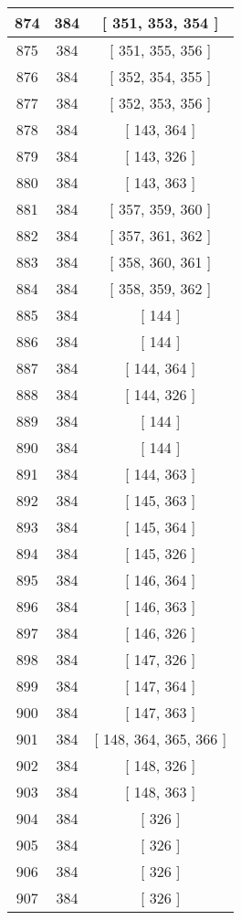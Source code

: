 \begin{center}
\begin{longtable}[H]{|| c c c ||}
\hline
874 & 384 & [ 351, 353, 354 ] \\ 
\hline
875 & 384 & [ 351, 355, 356 ] \\ 
\hline
876 & 384 & [ 352, 354, 355 ] \\ 
\hline
877 & 384 & [ 352, 353, 356 ] \\ 
\hline
878 & 384 & [ 143, 364 ] \\ 
\hline
879 & 384 & [ 143, 326 ] \\ 
\hline
880 & 384 & [ 143, 363 ] \\ 
\hline
881 & 384 & [ 357, 359, 360 ] \\ 
\hline
882 & 384 & [ 357, 361, 362 ] \\ 
\hline
883 & 384 & [ 358, 360, 361 ] \\ 
\hline
884 & 384 & [ 358, 359, 362 ] \\ 
\hline
885 & 384 & [ 144 ] \\ 
\hline
886 & 384 & [ 144 ] \\ 
\hline
887 & 384 & [ 144, 364 ] \\ 
\hline
888 & 384 & [ 144, 326 ] \\ 
\hline
889 & 384 & [ 144 ] \\ 
\hline
890 & 384 & [ 144 ] \\ 
\hline
891 & 384 & [ 144, 363 ] \\ 
\hline
892 & 384 & [ 145, 363 ] \\ 
\hline
893 & 384 & [ 145, 364 ] \\ 
\hline
894 & 384 & [ 145, 326 ] \\ 
\hline
895 & 384 & [ 146, 364 ] \\ 
\hline
896 & 384 & [ 146, 363 ] \\ 
\hline
897 & 384 & [ 146, 326 ] \\ 
\hline
898 & 384 & [ 147, 326 ] \\ 
\hline
899 & 384 & [ 147, 364 ] \\ 
\hline
900 & 384 & [ 147, 363 ] \\ 
\hline
901 & 384 & [ 148, 364, 365, 366 ] \\ 
\hline
902 & 384 & [ 148, 326 ] \\ 
\hline
903 & 384 & [ 148, 363 ] \\ 
\hline
904 & 384 & [ 326 ] \\ 
\hline
905 & 384 & [ 326 ] \\ 
\hline
906 & 384 & [ 326 ] \\ 
\hline
907 & 384 & [ 326 ] \\ 
\hline

\end{longtable}
\end{center}
